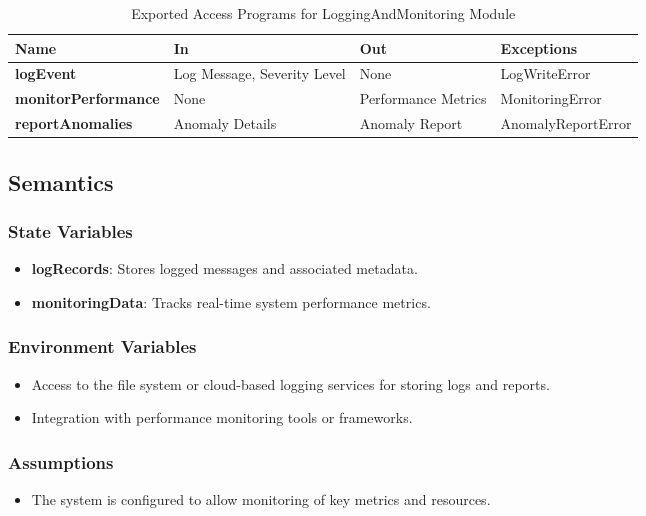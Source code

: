 \documentclass[12pt, titlepage]{article}
\begin{document}
\begin{table}[h!]
\centering
\begin{tabular}{|p{4cm}|p{4cm}|p{4cm}|p{4cm}|}
    \hline
    \textbf{Name} & \textbf{In} & \textbf{Out} & \textbf{Exceptions} \\
    \hline
    \textbf{logEvent} & Log Message, Severity Level & None & LogWriteError \\
    \hline
    \textbf{monitorPerformance} & None & Performance Metrics & MonitoringError \\
    \hline
    \textbf{reportAnomalies} & Anomaly Details & Anomaly Report & AnomalyReportError \\
    \hline
\end{tabular}
\caption{Exported Access Programs for LoggingAndMonitoring Module}
\label{table:logging}
\end{table}

\subsection{Semantics}

\subsubsection{State Variables}
\begin{itemize}
    \item \textbf{logRecords}: Stores logged messages and associated metadata.
    \item \textbf{monitoringData}: Tracks real-time system performance metrics.
\end{itemize}

\subsubsection{Environment Variables}
\begin{itemize}
    \item Access to the file system or cloud-based logging services for storing logs and reports.
    \item Integration with performance monitoring tools or frameworks.
\end{itemize}

\subsubsection{Assumptions}
\begin{itemize}
    \item The system is configured to allow monitoring of key metrics and resources.
\end{itemize}
\end{document}
